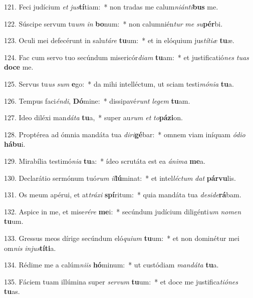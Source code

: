 121. Feci judícium \textit{et} \textit{jus}\textbf{tí}tiam:~*  non tradas me calum\textit{ni}\textit{án}\textit{ti}\textbf{bus} me.\

122. Súscipe servum tu\textit{um} \textit{in} \textbf{bo}num:~*  non calumnién\textit{tur} \textit{me} \textit{su}\textbf{pér}bi.\

123. Oculi mei defecérunt in salu\textit{tá}\textit{re} \textbf{tu}um:~*  et in elóquium jus\textit{tí}\textit{ti}\textit{æ} \textbf{tu}æ.\

124. Fac cum servo tuo secúndum misericór\textit{di}\textit{am} \textbf{tu}am:~*  et justificatió\textit{nes} \textit{tu}\textit{as} \textbf{do}\textbf{ce} me.\

125. Servus tu\textit{us} \textit{sum} \textbf{e}go:~*  da mihi intelléctum, ut sciam testi\textit{mó}\textit{ni}\textit{a} \textbf{tu}a.\

126. Tempus faci\textit{én}\textit{di}, \textbf{Dó}mine:~*  dissipavé\textit{runt} \textit{le}\textit{gem} \textbf{tu}am.\

127. Ideo diléxi man\textit{dá}\textit{ta} \textbf{tu}a,~*  super au\textit{rum} \textit{et} \textit{to}\textbf{pá}\textbf{zi}on.\

128. Proptérea ad ómnia mandáta tua \textit{di}\textit{ri}\textbf{gé}bar:~*  omnem viam iníquam \textit{ó}\textit{di}\textit{o} \textbf{há}\textbf{bu}i.\

129. Mirabília testimó\textit{ni}\textit{a} \textbf{tu}a:~*  ídeo scrutáta est ea \textit{á}\textit{ni}\textit{ma} \textbf{me}a.\

130. Declarátio sermónum tuó\textit{rum} \textit{il}\textbf{lú}minat:~*  et intel\textit{léc}\textit{tum} \textit{dat} \textbf{pár}\textbf{vu}lis.\

131. Os meum apérui, et at\textit{trá}\textit{xi} \textbf{spí}ritum:~*  quia mandáta tua \textit{de}\textit{si}\textit{de}\textbf{rá}bam.\

132. Aspice in me, et mise\textit{ré}\textit{re} \textbf{me}i:~*  secúndum judícium diligénti\textit{um} \textit{no}\textit{men} \textbf{tu}um.\

133. Gressus meos dírige secúndum eló\textit{qui}\textit{um} \textbf{tu}um:~*  et non dominétur mei om\textit{nis} \textit{in}\textit{jus}\textbf{tí}\textbf{ti}a.\

134. Rédime me a calúm\textit{ni}\textit{is} \textbf{hó}minum:~*  ut custódiam \textit{man}\textit{dá}\textit{ta} \textbf{tu}a.\

135. Fáciem tuam illúmina super \textit{ser}\textit{vum} \textbf{tu}um:~*  et doce me justifica\textit{ti}\textit{ó}\textit{nes} \textbf{tu}as.\

